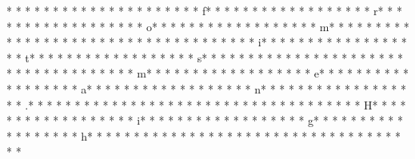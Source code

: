 * *  *  * * *  * * *  * * *  *  * * *  *  * * *  * f* * *  * * *  * * *  *  * * *  *  * * *  * r* * *  * * *  * * *  *  * * *  *  * * *  * o* * *  * * *  * * *  *  * * *  *  * * *  * m* * *  * * *  * * *  *  * * *  *  * * *  *  * * *  * * *  * * *  *  * * *  *  * * *  * i* * *  * * *  * * *  *  * * *  *  * * *  * t* * *  * * *  * * *  *  * * *  *  * * *  * s* * *  * * *  * * *  *  * * *  *  * * *  *  * * *  * * *  * * *  *  * * *  *  * * *  * m* * *  * * *  * * *  *  * * *  *  * * *  * e* * *  * * *  * * *  *  * * *  *  * * *  * a* * *  * * *  * * *  *  * * *  *  * * *  * n* * *  * * *  * * *  *  * * *  *  * * *  * .* * *  * * *  * * *  *  * * *  *  * * *  *  * * *  * * *  * * *  *  * * *  *  * * *  * H* * *  * * *  * * *  *  * * *  *  * * *  * i* * *  * * *  * * *  *  * * *  *  * * *  * g* * *  * * *  * * *  *  * * *  *  * * *  * h* * *  * * *  * * *  *  * * *  *  * * *  *  * * *  * * *  * * *  *  * * *  *  * * *  * 
